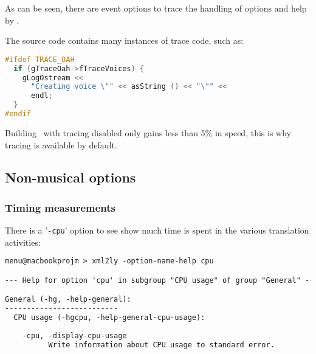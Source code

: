 \documentclass[12pt,a4paper]{article}
\begin{document}
As can be seen, there are event options to trace the handling of options and help by \xmlToLy.

The source code contains many instances of trace code, such as:
\begin{lstlisting}[language=C++]
#ifdef TRACE_OAH
  if (gTraceOah->fTraceVoices) {
    gLogOstream <<
      "Creating voice \"" << asString () << "\"" <<
      endl;
  }
#endif
\end{lstlisting}

Building \xmlToLy\ with tracing disabled only gains less than 5\% in speed, this is why tracing is available by default.

\subsection{Non-musical options}

\subsubsection{Timing measurements}

There is a '{\tt -cpu}' option to see show much time is spent in the various translation activities:
\begin{lstlisting}[language=XML]
menu@macbookprojm > xml2ly -option-name-help cpu  

--- Help for option 'cpu' in subgroup "CPU usage" of group "General" ---

General (-hg, -help-general):
--------------------------
  CPU usage (-hgcpu, -help-general-cpu-usage):
  
    -cpu, -display-cpu-usage
          Write information about CPU usage to standard error.
\end{lstlisting}
\end{document}
